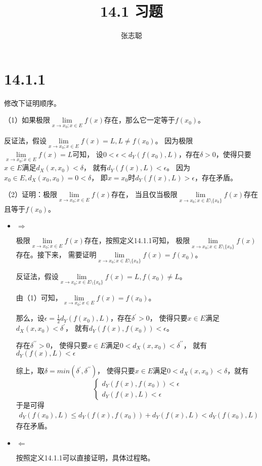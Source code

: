 \documentclass{article}
\begin{document}
\title{14.1 习题}
\author{张志聪}
\maketitle

\section*{14.1.1}
修改下证明顺序。

（1）如果极限$\lim\limits_{x \to x_0; x \in E} f(x)$存在，那么它一定等于$f(x_0)$。

反证法，假设$\lim\limits_{x \to x_0; x \in E} f(x) = L, L \neq f(x_0)$。
因为极限$\lim\limits_{x \to x_0; x \in E} f(x) = L$可知，
设$0 < \epsilon < d_Y(f(x_0), L)$，存在$\delta > 0$，使得只要$x \in E$满足$d_X(x, x_0) < \delta$，
就有$d_Y(f(x), L) < \epsilon$。
因为$x_0 \in E, d_X(x_0, x_0) = 0 < \delta$，
即$x = x_0$时$d_Y(f(x), L) > \epsilon$，存在矛盾。



（2）证明：极限$\lim\limits_{x \to x_0; x \in E} f(x)$存在，
当且仅当极限$\lim\limits_{x \to x_0; x \in E \setminus \{x_0\}} f(x)$存在且等于$f(x_0)$。

\begin{itemize}
  \item $\Rightarrow$

        极限$\lim\limits_{x \to x_0; x \in E} f(x)$存在，按照定义14.1.1可知，
        极限$\lim\limits_{x \to x_0; x \in E \setminus \{x_0\}} f(x)$存在。接下来，
        需要证明$\lim\limits_{x \to x_0; x \in E \setminus \{x_0\}} f(x) = f(x_0)$。

        反证法，假设$\lim\limits_{x \to x_0; x \in E \setminus \{x_0\}} f(x) = L, f(x_0) \neq L$。

        由（1）可知，$\lim\limits_{x \to x_0; x \in E} f(x) = f(x_0)$。

        那么，设$\epsilon = \frac{1}{2} d_Y(f(x_0), L)$，存在$\delta^\prime > 0$，
        使得只要$x \in E$满足$d_X(x, x_0) < \delta^\prime$， 就有$d_Y(f(x), f(x_0)) < \epsilon$。

        存在$\delta^{\prime\prime} > 0$，
        使得只要$x \in E$满足$0 < d_X(x, x_0) < \delta^{\prime\prime}$， 就有$d_Y(f(x), L) < \epsilon$

        综上，取$\delta = min(\delta^\prime, \delta^{\prime\prime})$，
        使得只要$x \in E$满足$0 < d_X(x, x_0) < \delta$，就有
        \begin{equation*}
          \begin{cases*}
            d_Y(f(x), f(x_0)) < \epsilon \\
            d_Y(f(x), L) < \epsilon
          \end{cases*}
        \end{equation*}
        于是可得
        \begin{align*}
          d_Y(f(x_0), L) \leq d_Y(f(x), f(x_0)) + d_Y(f(x), L) < d_Y(f(x_0), L)
        \end{align*}
        存在矛盾。

  \item $\Leftarrow$

        按照定义14.1.1可以直接证明，具体过程略。
\end{itemize}
\end{document}

